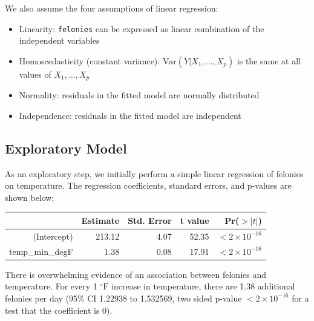 \documentclass[11pt,notitlepage]{article}
\newenvironment{codeSmall}%
   {\par\noindent\adjustbox{margin=1ex,bgcolor=shadecolor,margin=0ex \medskipamount}\bgroup\minipage\linewidth\verbatim\footnotesize}%
   {\endverbatim\endminipage\egroup}
\newcommand{\degf}{^\circ\text{F}}
\begin{document}
We also assume the four assumptions of linear regression:
\begin{itemize}
\setlength\itemsep{-1pt}

\item Linearity: \texttt{felonies} can be expressed as linear combination of the independent variables
\item Homoscedasticity (constant variance): $\text{Var}(Y|X_1,\ldots, X_p)$ is the same at all values of $X_1,\ldots, X_p$
\item Normality: residuals in the fitted model are normally distributed
\item Independence: residuals in the fitted model are independent
\end{itemize}


\subsection{Exploratory Model}
\label{sec:feloniesExploratoryModel}

As an exploratory step, we initially perform a simple linear regression of felonies on temperature. The regression coefficients, standard errors, and p-values are shown below:


\begin{table}[ht]
\footnotesize
\centering
\begin{tabular}{rrrrr}
  \hline
 & Estimate & Std. Error & t value & Pr($>|t|$) \\ 
  \hline
(Intercept) & 213.12 & 4.07 & 52.35 & $<2 \times 10^{-16}$ \\ 
  temp\_min\_degF & 1.38 & 0.08 & 17.91 & $<2 \times 10^{-16}$ \\ 
   \hline
\end{tabular}
\end{table}



There is overwhelming evidence of an association between felonies and temperature. For every 1 $\degf$ increase in temperature, there are 1.38 additional felonies per day (95\% CI 1.22938 to 1.532569, two sided p-value $<2\times10^{-16}$ for a test that the coefficient is 0).
\end{document}
